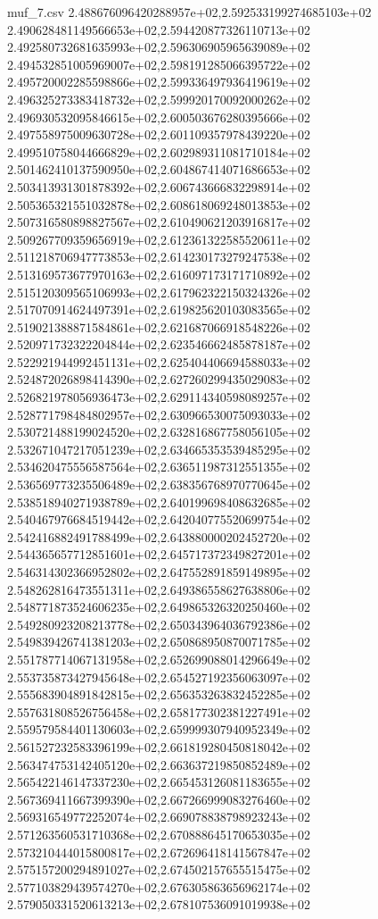 \begin{filecontents*}{muf_7.csv}
2.488676096420288957e+02,2.592533199274685103e+02
2.490628481149566653e+02,2.594420877326110713e+02
2.492580732681635993e+02,2.596306905965639089e+02
2.494532851005969007e+02,2.598191285066395722e+02
2.495720002285598866e+02,2.599336497936419619e+02
2.496325273383418732e+02,2.599920170092000262e+02
2.496930532095846615e+02,2.600503676280395666e+02
2.497558975009630728e+02,2.601109357978439220e+02
2.499510758044666829e+02,2.602989311081710184e+02
2.501462410137590950e+02,2.604867414071686653e+02
2.503413931301878392e+02,2.606743666832298914e+02
2.505365321551032878e+02,2.608618069248013853e+02
2.507316580898827567e+02,2.610490621203916817e+02
2.509267709359656919e+02,2.612361322585520611e+02
2.511218706947773853e+02,2.614230173279247538e+02
2.513169573677970163e+02,2.616097173171710892e+02
2.515120309565106993e+02,2.617962322150324326e+02
2.517070914624497391e+02,2.619825620103083565e+02
2.519021388871584861e+02,2.621687066918548226e+02
2.520971732322204844e+02,2.623546662485878187e+02
2.522921944992451131e+02,2.625404406694588033e+02
2.524872026898414390e+02,2.627260299435029083e+02
2.526821978056936473e+02,2.629114340598089257e+02
2.528771798484802957e+02,2.630966530075093033e+02
2.530721488199024520e+02,2.632816867758056105e+02
2.532671047217051239e+02,2.634665353539485295e+02
2.534620475556587564e+02,2.636511987312551355e+02
2.536569773235506489e+02,2.638356768970770645e+02
2.538518940271938789e+02,2.640199698408632685e+02
2.540467976684519442e+02,2.642040775520699754e+02
2.542416882491788499e+02,2.643880000202452720e+02
2.544365657712851601e+02,2.645717372349827201e+02
2.546314302366952802e+02,2.647552891859149895e+02
2.548262816473551311e+02,2.649386558627638806e+02
2.548771873524606235e+02,2.649865326320250460e+02
2.549280923208213778e+02,2.650343964036792386e+02
2.549839426741381203e+02,2.650868950870071785e+02
2.551787714067131958e+02,2.652699088014296649e+02
2.553735873427945648e+02,2.654527192356063097e+02
2.555683904891842815e+02,2.656353263832452285e+02
2.557631808526756458e+02,2.658177302381227491e+02
2.559579584401130603e+02,2.659999307940952349e+02
2.561527232583396199e+02,2.661819280450818042e+02
2.563474753142405120e+02,2.663637219850852489e+02
2.565422146147337230e+02,2.665453126081183655e+02
2.567369411667399390e+02,2.667266999083276460e+02
2.569316549772252074e+02,2.669078838798923243e+02
2.571263560531710368e+02,2.670888645170653035e+02
2.573210444015800817e+02,2.672696418141567847e+02
2.575157200294891027e+02,2.674502157655515475e+02
2.577103829439574270e+02,2.676305863656962174e+02
2.579050331520613213e+02,2.678107536091019938e+02

\end{filecontents*}
